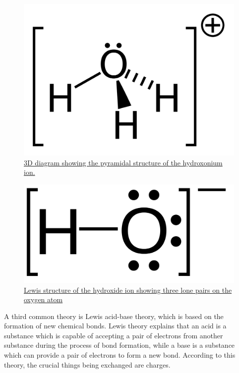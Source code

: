 \begin{figure}

{\centering \includegraphics[width=0.7\linewidth]{./figures/chemistry/Hydroxonium-cation} 

}

\caption{\href{https://commons.wikimedia.org/wiki/File:Hydroxonium-cation.svg}{3D diagram showing the pyramidal structure of the hydroxonium ion.}}\label{fig:hydroxoniumion}
\end{figure}



\begin{figure}

{\centering \includegraphics[width=0.7\linewidth]{./figures/chemistry/Hydroxide_lone_pairs-2D} 

}

\caption{\href{https://commons.wikimedia.org/wiki/File:Hydroxide_lone_pairs-2D.svg}{Lewis structure of the hydroxide ion showing three lone pairs on the oxygen atom}}\label{fig:hydroxideion}
\end{figure}

A third common theory is Lewis acid-base theory, which is based on the formation of new chemical bonds. Lewis theory explains that an acid is a substance which is capable of accepting a pair of electrons from another substance during the process of bond formation, while a base is a substance which can provide a pair of electrons to form a new bond. According to this theory, the crucial things being exchanged are charges.

